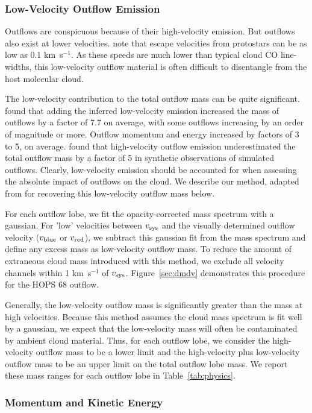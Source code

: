 \documentclass[twocolumn]{aastex63}
\newcommand{\example}{HOPS 68}
\newcommand{\kms}{km~s$^{-1}$}
\begin{document}
\subsubsection{Low-Velocity Outflow Emission}
Outflows are conspicuous because of their high-velocity emission. But outflows also exist at lower velocities. \citet{Dunham14} note that escape velocities from protostars can be as low as 0.1 \kms. As these speeds are much lower than typical cloud CO line-widths, this low-velocity outflow material is often difficult to disentangle from the host molecular cloud.

The low-velocity contribution to the total outflow mass can be quite significant. \citet{Dunham14} found that adding the inferred low-velocity emission increased the mass of outflows by a factor of 7.7 on average, with some outflows increasing by an order of magnitude or more. Outflow momentum and energy increased by factors of 3 to 5, on average. \citet{Offner11} found that high-velocity outflow emission underestimated the total outflow mass by a factor of 5 in synthetic observations of simulated outflows. Clearly, low-velocity emission should be accounted for when assessing the absolute impact of outflows on the cloud. We describe our method, adapted from \citet{Dunham14} for recovering this low-velocity outflow mass below. 

For each outflow lobe, we fit the opacity-corrected mass spectrum with a gaussian. For 'low' velocities between $v_{\rm sys}$ and the visually determined outflow velocity ($v_{\rm blue}$ or $v_{\rm red}$), we subtract this gaussian fit from the mass spectrum and define any excess mass as low-velocity outflow mass. To reduce the amount of extraneous cloud mass introduced with this method, we exclude all velocity channels within 1 \kms{} of $v_{\rm sys}$. Figure~\ref{sec:dmdv} demonstrates this procedure for the \example{} outflow. 

Generally, the low-velocity outflow mass is significantly greater than the mass at high velocities. Because this method assumes the cloud mass spectrum is fit well by a gaussian, we expect that the low-velocity mass will often be contaminated by ambient cloud material. Thus, for each outflow lobe, we consider the high-velocity outflow mass to be a lower limit and the high-velocity plus low-velocity outflow mass to be an upper limit on the total outflow lobe mass. We report these mass ranges for each outflow lobe in Table~\ref{tab:physics}.

\subsubsection{Momentum and Kinetic Energy}
\end{document}

